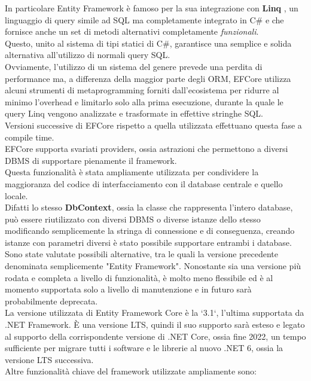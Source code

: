 \documentclass[\main/Tesi.tex]{subfiles}
\begin{document}
In particolare Entity Framework è famoso per la sua integrazione con \textbf{Linq} \cite{linq}, un linguaggio di query simile ad SQL ma completamente integrato in C\# e che fornisce anche un set di metodi alternativi completamente \textit{funzionali}.\\
Questo, unito al sistema di tipi statici di C\#, garantisce una semplice e solida alternativa all'utilizzo di normali query SQL.\\
Ovviamente, l'utilizzo di un sistema del genere prevede una perdita di performance ma, a differenza della maggior parte degli ORM, EFCore utilizza alcuni strumenti di metaprogramming forniti dall'ecosistema per ridurre al minimo l'overhead e limitarlo solo alla prima esecuzione, durante la quale le query Linq vengono analizzate e trasformate in effettive stringhe SQL.\\
Versioni successive di EFCore rispetto a quella utilizzata effettuano questa fase a compile time.\\
EFCore supporta svariati providers, ossia astrazioni che permettono a diversi DBMS di supportare pienamente il framework.\\
Questa funzionalità è stata ampliamente utilizzata per condividere la maggioranza del codice di interfacciamento con il database centrale e quello locale.\\
Difatti lo stesso \textbf{DbContext}, ossia la classe che rappresenta l'intero database, può essere riutilizzato con diversi DBMS o diverse istanze dello stesso modificando semplicemente la stringa di connessione e di conseguenza, creando istanze con parametri diversi è stato possibile supportare entrambi i database.\\
Sono state valutate possibili alternative, tra le quali la versione precedente denominata semplicemente "Entity Framework". Nonostante sia una versione più rodata e completa a livello di funzionalità, è molto meno flessibile ed è al momento supportata solo a livello di manutenzione e in futuro sarà probabilmente deprecata.\\
La versione utilizzata di Entity Framework Core è la `3.1`, l'ultima supportata da .NET Framework. È una versione LTS, quindi il suo supporto sarà esteso e legato al supporto della corrispondente versione di .NET Core, ossia fine 2022, un tempo sufficiente per migrare tutti i software e le librerie al nuovo .NET 6, ossia la versione LTS successiva.\\
Altre funzionalità chiave del framework utilizzate ampliamente sono:
\end{document}
